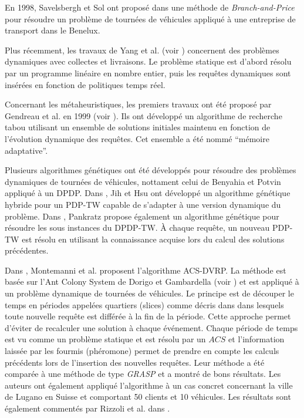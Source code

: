 En 1998, Savelsbergh et Sol ont proposé dans \cite{Savelsbergh1998} une méthode de \textit{Branch-and-Price} pour résoudre un problème de tournées de véhicules appliqué à une entreprise de transport dans le Benelux.

Plus récemment, les travaux de Yang et al. (voir \cite{Yang2004}) concernent des problèmes dynamiques avec collectes et livraisons. Le problème statique est d'abord résolu par un programme linéaire en nombre entier, puis les requêtes dynamiques sont insérées en fonction de politiques temps réel. 

Concernant les métaheuristiques, les premiers travaux ont été proposé par Gendreau et al. en 1999 (voir \cite{Gendreau1999}). Ils ont développé un algorithme de recherche tabou utilisant un ensemble de solutions initiales maintenu en fonction de l'évolution dynamique des requêtes. Cet ensemble a été nommé ``mémoire adaptative''. 

Plusieurs algorithmes génétiques ont été développés pour résoudre des problèmes dynamiques de tournées de véhicules, nottament celui de Benyahia et Potvin \cite{Benyahia1998} appliqué à un DPDP. Dans \cite{Jih1999}, Jih et Hsu ont développé un algorithme génétique hybride pour un PDP-TW capable de s'adapter à une version dynamique du problème. Dans \cite{Pankratz2005b}, Pankratz propose également un algorithme génétique pour résoudre les sous instances du DPDP-TW. À chaque requête, un nouveau PDP-TW est résolu en utilisant la connaissance acquise lors du calcul des solutions précédentes.

Dans \cite{Montemanni2005}, Montemanni et al. proposent l'algorithme ACS-DVRP. La méthode est basée sur l'Ant Colony System de Dorigo et Gambardella (voir \cite{Dorigo1997}) et est appliqué à un problème dynamique de tournées de véhicules. Le principe est de découper le temps en périodes appelées quartiers (slices) comme décris dans \cite{Kilby1998} dans lesquels toute nouvelle requête est différée à la fin de la période. Cette approche permet d'éviter de recalculer une solution à chaque événement. Chaque période de temps est vu comme un problème statique et est résolu par un $ACS$ et l'information laissée par les fourmis (phéromone) permet de prendre en compte les calculs précédents lors de l'insertion des nouvelles requêtes. Leur méthode a été comparée à une méthode de type \textit{GRASP} et a montré de bons résultats. Les auteurs ont également appliqué l'algorithme à un cas concret concernant la ville de Lugano en Suisse et comportant 50 clients et 10 véhicules. Les résultats sont également commentés par 
Rizzoli et al. dans \cite{Rizzoli2007}.\\


